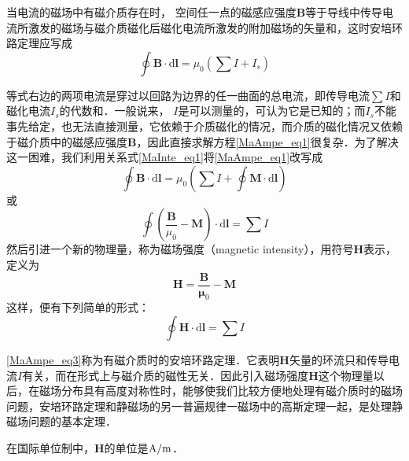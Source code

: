 

当电流的磁场中有磁介质存在时， 空间任一点的磁感应强度$\mathbf B $等于导线中传导电流所激发的磁场与磁介质磁化后磁化电流所激发的附加磁场的矢量和，这时安培环路定理应写成
\begin{equation} \label{MaAmpe_eq1}
\oint \mathbf{B} \cdot \mathrm{d} \mathbf{l}=\mu_{0}\left(\sum I+I_{s}\right)
\end{equation}

等式右边的两项电流是穿过以回路为边界的任一曲面的总电流，即传导电流$\sum I$和磁化电流$I_s$的代数和．一般说来， $I $是可以测量的，可认为它是已知的；而$I_s$不能事先给定，也无法直接测量，它依赖于介质磁化的情况，而介质的磁化情况又依赖于磁介质中的磁感应强度$\mathbf B$，因此直接求解方程\autoref{MaAmpe_eq1}很复杂．为了解决这一困难，我们利用关系式\autoref{MaInte_eq1}将\autoref{MaAmpe_eq1}改写成
\begin{equation}
\oint \mathbf{B} \cdot \mathrm{d} \mathbf{l}=\mu_{0}\left(\sum I+\oint \mathbf{M} \cdot \mathrm{d} \mathbf{l}\right)
\end{equation}
或
\begin{equation}
\oint\left(\frac{\mathbf{B}}{\mu_{0}}-\mathbf{M}\right) \cdot \mathrm{d} \mathbf{l}=\sum I
\end{equation}
然后引进一个新的物理量，称为磁场强度（magnetic intensity），用符号$\mathbf H$表示，定义为
\begin{equation} \label{MaAmpe_eq2}
\mathbf{H}=\frac{\mathbf{B}}{\mathbf{\mu}_{0}}-\mathbf{M}
\end{equation}
这样，便有下列简单的形式：
\begin{equation} \label{MaAmpe_eq3}
\oint \mathbf{H} \cdot \mathrm{d} \mathbf{l}=\sum I
\end{equation}

\autoref{MaAmpe_eq3}称为有磁介质时的安培环路定理．它表明$\mathbf H $矢量的环流只和传导电流$I $有关，而在形式上与磁介质的磁性无关．因此引入磁场强度$\mathbf H $这个物理量以后，在磁场分布具有高度对称性时，能够使我们比较方便地处理有磁介质时的磁场问题，安培环路定理和静磁场的另一普遍规律一磁场中的高斯定理一起，是处理静磁场问题的基本定理．

在国际单位制中，$\mathbf  H $的单位是$\rm A/m$．

